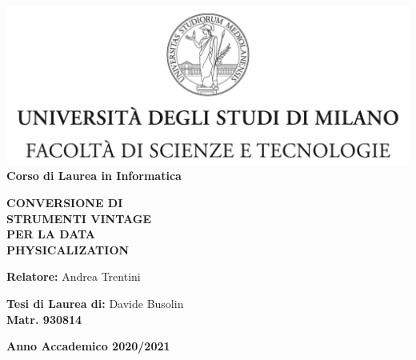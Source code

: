 \documentclass[12pt,a4paper]{report}
\begin{document}
\begin{titlepage}
\begin{center}
\includegraphics[width=\textwidth]{Logo.jpg}\\
{\large{\bf Corso di Laurea in Informatica}}
\end{center}
\vspace{12mm}
\begin{center}
{\huge{\bf CONVERSIONE DI}}\\
\vspace{4mm}
{\huge{\bf STRUMENTI VINTAGE}}\\
\vspace{4mm}
{\huge{\bf PER LA DATA}}\\
\vspace{4mm}
{\huge{\bf PHYSICALIZATION}}\\
\end{center}
\vspace{12mm}
\begin{flushleft}
{\large{\bf Relatore:}}
{\large{Andrea Trentini}}\\
\vspace{4mm}
\end{flushleft}
\vspace{12mm}
\begin{flushright}
{\large{\bf Tesi di Laurea di:}}
{\large{Davide Busolin}}\\
{\large{\bf Matr. 930814}}\\
\end{flushright}
\vspace{4mm}
\begin{center}
{\large{\bf Anno Accademico 2020/2021}}
\end{center}
\end{titlepage}


\tableofcontents
\end{document}
